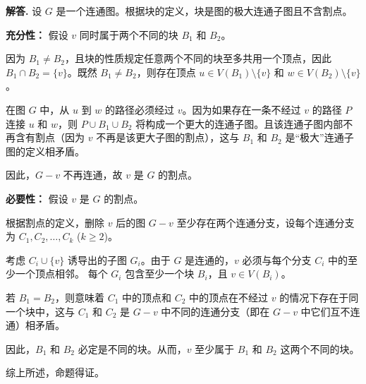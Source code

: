 \documentclass[12pt, a4paper, oneside]{ctexart}
\newenvironment{solution}{\par\noindent\textbf{解答. }}{\par}
\begin{document}
\begin{solution}
    设 $G$ 是一个连通图。根据块的定义，块是图的极大连通子图且不含割点。

\textbf{充分性：}
假设 $v$ 同时属于两个不同的块 $B_1$ 和 $B_2$。

因为 $B_1 \neq B_2$，且块的性质规定任意两个不同的块至多共用一个顶点，因此 $B_1 \cap B_2 = \{v\}$。既然 $B_1 \neq B_2$，则存在顶点 $u \in V(B_1) \setminus \{v\}$ 和 $w \in V(B_2) \setminus \{v\}$。

在图 $G$ 中，从 $u$ 到 $w$ 的路径必须经过 $v$。因为如果存在一条不经过 $v$ 的路径 $P$ 连接 $u$ 和 $w$，则 $P \cup B_1 \cup B_2$ 将构成一个更大的连通子图。且该连通子图内部不再含有割点（因为 $v$ 不再是该更大子图的割点），这与 $B_1$ 和 $B_2$ 是“极大”连通子图的定义相矛盾。

因此，$G-v$ 不再连通，故 $v$ 是 $G$ 的割点。


\textbf{必要性：}
假设 $v$ 是 $G$ 的割点。

根据割点的定义，删除 $v$ 后的图 $G-v$ 至少存在两个连通分支，设每个连通分支为 $C_1, C_2, \dots, C_k$ ($k \ge 2$)。

考虑 $C_i \cup \{v\}$ 诱导出的子图 $G_i$。由于 $G$ 是连通的，$v$ 必须与每个分支 $C_i$ 中的至少一个顶点相邻。
每个 $G_i$ 包含至少一个块 $B_i$，且 $v \in V(B_i)$。

若 $B_1 = B_2$，则意味着 $C_1$ 中的顶点和 $C_2$ 中的顶点在不经过 $v$ 的情况下存在于同一个块中，这与 $C_1$ 和 $C_2$ 是 $G-v$ 中不同的连通分支（即在 $G-v$ 中它们互不连通）相矛盾。

因此，$B_1$ 和 $B_2$ 必定是不同的块。从而，$v$ 至少属于 $B_1$ 和 $B_2$ 这两个不同的块。


综上所述，命题得证。
\end{solution}
\end{document}
